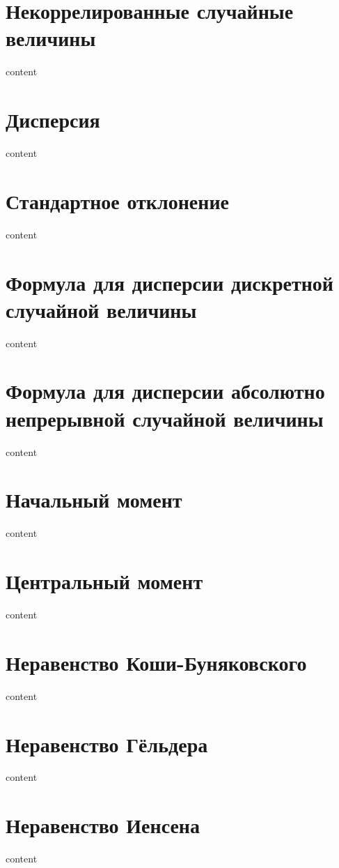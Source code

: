 \section{Некоррелированные случайные величины}

content

\section{Дисперсия}

content

\section{Стандартное отклонение}

content

\section{Формула для дисперсии дискретной случайной величины}

content

\section{Формула для дисперсии абсолютно непрерывной случайной величины}

content

\section{Начальный момент}

content

\section{Центральный момент}

content

\section{Неравенство Коши-Буняковского}

content

\section{Неравенство Гёльдера}

content

\section{Неравенство Иенсена}

content
